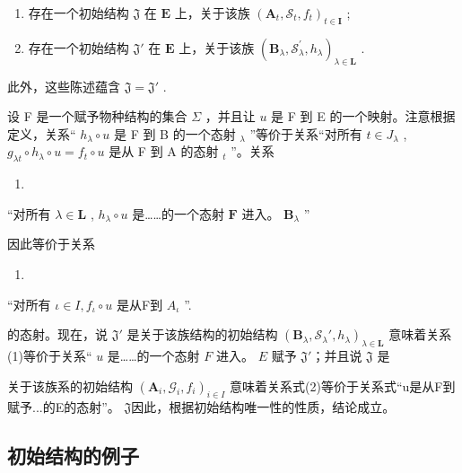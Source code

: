 \begin{enumerate}
\def\labelenumi{(\alph{enumi})}
\item
  存在一个初始结构 \(\mathfrak{J}\) 在 \(\mathbf{E}\) 上，关于该族 \((\mathbf{A}_t, \mathcal{S}_t, f_t)_{t \in \mathbf{I}}\) ;
\item
  存在一个初始结构 \(\mathfrak{J}'\) 在 \(\mathbf{E}\) 上，关于该族 \((\mathbf{B}_{\lambda},\mathcal{S}_{\lambda}^{\prime},h_{\lambda})_{\lambda \in \mathbf{L}}\) .
\end{enumerate}

此外，这些陈述蕴含 \(\mathfrak{J} = \mathfrak{J}'\) .

设 F 是一个赋予物种结构的集合 \(\Sigma\) ，并且让 \(u\) 是 F 到 E 的一个映射。注意根据定义，关系“ \(h_{\lambda} \circ u\) 是 F 到 B 的一个态射 \(_{\lambda}\) ”等价于关系“对所有 \(t \in J_{\lambda}\) , \(g_{\lambda t} \circ h_{\lambda} \circ u = f_{t} \circ u\) 是从 F 到 A 的态射 \(_{t}\) ''。关系

\begin{enumerate}
\def\labelenumi{(\arabic{enumi})}
\tightlist
\item
\end{enumerate}

``对所有 \(\lambda \in \mathbf{L}\) , \(h_{\lambda} \circ u\) 是……的一个态射 \(\mathbf{F}\) 进入。 \(\mathbf{B}_{\lambda}\) ''

因此等价于关系

\begin{enumerate}
\def\labelenumi{(\arabic{enumi})}
\setcounter{enumi}{1}
\tightlist
\item
\end{enumerate}

``对所有 \(\iota\in I,f_{\iota}\circ u\) 是从F到 \(A_{\iota}\) ''.

的态射。现在，说 \(\mathfrak{J}'\) 是关于该族结构的初始结构 \((\mathbf{B}_{\lambda}, \mathcal{S}_{\lambda}', h_{\lambda})_{\lambda \in \mathbf{L}}\) 意味着关系(1)等价于关系“ \(u\) 是……的一个态射 \(F\) 进入。 \(E\) 赋予 \(\mathfrak{J}'\)；并且说 \(\mathfrak{J}\) 是

关于该族系的初始结构 \((\mathbf{A}_{i}, \mathcal{G}_{i}, f_{i})_{i \in I}\) 意味着关系式(2)等价于关系式“u是从F到赋予...的E的态射”。 \(\mathfrak{J}\)因此，根据初始结构唯一性的性质，结论成立。

\subsection{初始结构的例子}

